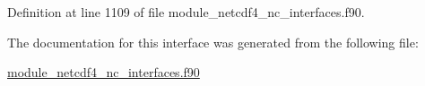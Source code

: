 Definition at line 1109 of file module\+\_\+netcdf4\+\_\+nc\+\_\+interfaces.\+f90.



The documentation for this interface was generated from the following file\+:\begin{DoxyCompactItemize}
\item 
\hyperlink{module__netcdf4__nc__interfaces_8f90}{module\+\_\+netcdf4\+\_\+nc\+\_\+interfaces.\+f90}\end{DoxyCompactItemize}
